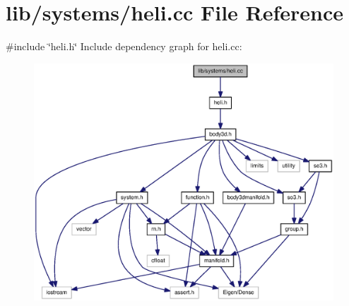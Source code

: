 \section{lib/systems/heli.cc \-File \-Reference}
\label{heli_8cc}
{\ttfamily \#include \char`\"{}heli.\-h\char`\"{}}\*
\-Include dependency graph for heli.\-cc\-:
\nopagebreak
\begin{figure}[H]
\begin{center}
\leavevmode
\includegraphics[width=350pt]{heli_8cc__incl}
\end{center}
\end{figure}
